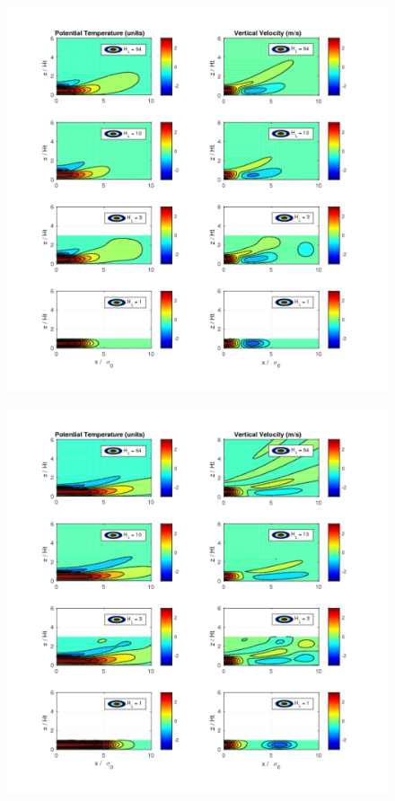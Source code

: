 \documentclass[a4paper,10pt]{article}
\begin{document}
\begin{figure}[h!]
  \caption{}
  \centering
    \includegraphics[width=1\textwidth]{raise_lid_t1.pdf}
  \label{raise_lid_t1}
\end{figure}

\begin{figure}[h!]
  \caption{}
  \centering
    \includegraphics[width=1\textwidth]{raise_lid_t2.pdf}
  \label{raise_lid_t2}
\end{figure}
\end{document}
